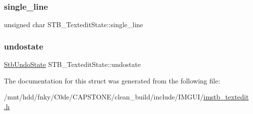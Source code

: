 \mbox{\label{structSTB__TexteditState_a63299aca2cb4e009dfa41cda5e651316}} 
\subsubsection{\texorpdfstring{single\+\_\+line}{single\_line}}
{\footnotesize\ttfamily unsigned char S\+T\+B\+\_\+\+Textedit\+State\+::single\+\_\+line}

\mbox{\label{structSTB__TexteditState_a7e1f0366bbd57e01a4f49a720beb9ead}} 
\subsubsection{\texorpdfstring{undostate}{undostate}}
{\footnotesize\ttfamily \hyperlink{structStbUndoState}{Stb\+Undo\+State} S\+T\+B\+\_\+\+Textedit\+State\+::undostate}



The documentation for this struct was generated from the following file\+:\begin{DoxyCompactItemize}
\item 
/mnt/hdd/fnky/\+C0de/\+C\+A\+P\+S\+T\+O\+N\+E/clean\+\_\+build/include/\+I\+M\+G\+U\+I/\hyperlink{imstb__textedit_8h}{imstb\+\_\+textedit.\+h}\end{DoxyCompactItemize}
